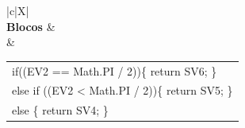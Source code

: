 \begin{xltabular}{\textwidth}{|c|X|}
 \\ \hline
\textbf{Blocos} &  \\ \hline
{} & \begin{tabular}[c]{@{}l@{}}if((EV2 == Math.PI / 2))\{   return SV6; \}\\ else if ((EV2 < Math.PI / 2))\{   return SV5; \}\\ else \{   return SV4; \} \end{tabular}  \\ \hline



\end{xltabular}
